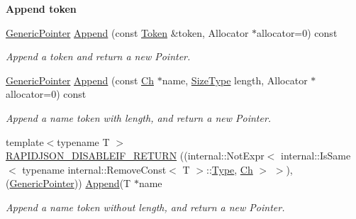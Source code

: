 \begin{Indent}{\bf Append token}\par
\begin{DoxyCompactItemize}
\item 
\hyperlink{classGenericPointer}{Generic\+Pointer} \hyperlink{classGenericPointer_a6d55ac55724890527e583f26b2774f02}{Append} (const \hyperlink{structGenericPointer_1_1Token}{Token} \&token, Allocator $\ast$allocator=0) const 
\begin{DoxyCompactList}\small\item\em Append a token and return a new Pointer. \end{DoxyCompactList}\item 
\hyperlink{classGenericPointer}{Generic\+Pointer} \hyperlink{classGenericPointer_a0f2c0586fd945bf25a5da228d085f74b}{Append} (const \hyperlink{classGenericPointer_ab292356c11b4015c98d21b966b11f285}{Ch} $\ast$name, \hyperlink{rapidjson_8h_a5ed6e6e67250fadbd041127e6386dcb5}{Size\+Type} length, Allocator $\ast$allocator=0) const 
\begin{DoxyCompactList}\small\item\em Append a name token with length, and return a new Pointer. \end{DoxyCompactList}\item 
{\footnotesize template$<$typename T $>$ }\\\hyperlink{classGenericPointer_aaf4d7d852098878d24188d134182d42f}{R\+A\+P\+I\+D\+J\+S\+O\+N\+\_\+\+D\+I\+S\+A\+B\+L\+E\+I\+F\+\_\+\+R\+E\+T\+U\+RN} ((internal\+::\+Not\+Expr$<$ internal\+::\+Is\+Same$<$ typename internal\+::\+Remove\+Const$<$ T $>$\+::\hyperlink{rapidjson_8h_a1d1cfd8ffb84e947f82999c682b666a7}{Type}, \hyperlink{classGenericPointer_ab292356c11b4015c98d21b966b11f285}{Ch} $>$ $>$),(\hyperlink{classGenericPointer}{Generic\+Pointer})) \hyperlink{classGenericPointer_a6d55ac55724890527e583f26b2774f02}{Append}(T $\ast$name
\begin{DoxyCompactList}\small\item\em Append a name token without length, and return a new Pointer. \end{DoxyCompactList}\end{DoxyCompactItemize}
\end{Indent}
